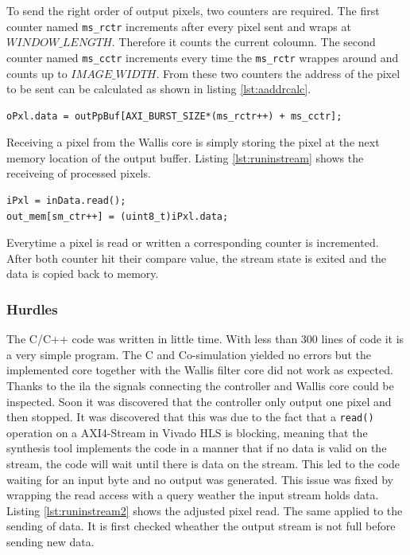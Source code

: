 To send the right order of output pixels, two counters are required. The first
counter named \texttt{ms\_rctr} increments after every pixel sent and wraps at
$WINDOW\_LENGTH$. Therefore it counts the current coloumn. The second counter
named \texttt{ms\_cctr} increments every time the \texttt{ms\_rctr} wrappes
around and counts up to $IMAGE\_WIDTH$. From these two counters the address of
the pixel to be sent can be calculated as shown in listing \ref{lst:aaddrcalc}.

\begin{minipage}{\textwidth}
\begin{lstlisting}[style=CStyle, caption=Pixel send address calculation,
label=lst:aaddrcalc]
oPxl.data = outPpBuf[AXI_BURST_SIZE*(ms_rctr++) + ms_cctr];\end{lstlisting}
\end{minipage}

Receiving a pixel from the Wallis core is simply storing the pixel at the next
memory location of the
output buffer. Listing \ref{lst:runinstream} shows the receiveing of processed
pixels.

\begin{minipage}{\textwidth}
\begin{lstlisting}[style=CStyle, caption=Pixel read store,
label=lst:runinstream]
iPxl = inData.read();
out_mem[sm_ctr++] = (uint8_t)iPxl.data;\end{lstlisting}
\end{minipage}

Everytime a pixel is read or written a corresponding counter is incremented.
After both counter hit their compare value, the stream state is exited and the
data is copied back to memory.

\subsubsection*{Hurdles}
The C/C++ code was written in little time. With less than 300 lines of code it
is a
very simple program. The C and Co-simulation yielded no errors but the
implemented core together with the Wallis filter core did not work as expected.
Thanks to the \gls{ila} the signals connecting the controller
and Wallis core could be inspected. Soon it was discovered that the controller
only output one pixel and then stopped. It was discovered that this was due to
the fact that a \texttt{read()} operation on a AXI4-Stream in Vivado HLS is
blocking, meaning that the synthesis tool implements the code in a  manner that
if no data is
valid on the stream, the code will wait until there is data on the stream. This
led to the code waiting for an input byte and no output was generated. This
issue was fixed by wrapping the read access with a query weather the input
stream holds data. Listing \ref{lst:runinstream2} shows the adjusted pixel read.
The same applied to the sending of data. It is first checked wheather the output
stream is not full before sending new data.

